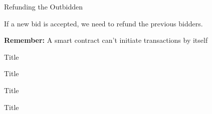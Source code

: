 \documentclass[]{beamer}
\begin{document}
\begin{frame}{Refunding the Outbidden}

If a new bid is accepted, we need to refund the previous bidders.

\vspace{1em}

\textbf{Remember:} A smart contract can't initiate transactions by itself

\vspace{1.5em}

\end{frame}


\begin{frame}{Title}

\end{frame}


\begin{frame}{Title}

\end{frame}


\begin{frame}{Title}

\end{frame}


\begin{frame}{Title}

\end{frame}
\end{document}
